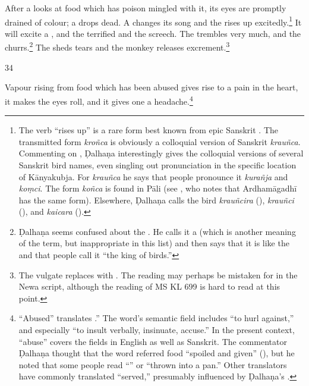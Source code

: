 \begin{translation}

After a  looks at
food which has poison mingled with it, its eyes are promptly drained of colour; a
 drops dead.  A  changes its song and the 
rises up excitedly.\footnote{The verb  “rises up” is a rare form
best known from epic Sanskrit \citep[see][212, \S 7.6.1]{ober-2003}.   The
transmitted form \emph{kroñca} is obviously a colloquial version of Sanskrit
\emph{krauñca}.  Commenting on , Ḍalhaṇa interestingly gives 
the
colloquial versions of several Sanskrit bird names, even singling out 
pronunciation in the specific location of Kānyakubja.  For \emph{krauñca} he says
that people pronounce it \emph{kurañja} and \emph{koṃci}.  The form 
\emph{koñca} is found in Pāli (see \cite[731]{cone-dict}, who notes that 
Ardhamāgadhī has the same form). Elsewhere, Ḍalhaṇa calls the bird 
\emph{krauñcira} (),  \emph{krauñci} 
(), and \emph{kaicara} ().}  It will excite a
, and the terrified
 and the 
screech. The  trembles very much, and the
churrs.\footnote{Ḍalhaṇa seems confused about the .  He calls it 
a
 (which is another meaning of the term, but inappropriate 
in
this list) and then says that it is like the  and that people
call it “the king of birds.”} The   sheds tears and the monkey
releases excrement.\footnote{The vulgate replaces  with
.  The reading  may perhaps be mistaken for
 in the Newa script, although the reading of MS KL 699 is hard to read at this 
point.}

\item[34]

Vapour rising from food which has been abused gives rise to a pain in the
heart, it makes the eyes roll, and it gives one a headache.\footnote{ “Abused” translates 
.”  The word's semantic field includes “to hurl against,” and especially “to 
insult verbally, insinuate, accuse.”  In the present context, “abuse” covers the fields in English 
as well as Sanskrit.  The commentator Ḍalhaṇa thought that the word referred food “spoiled 
and given” (), but he noted that some people 
read “” or “thrown into a pan.”  Other translators have commonly 
translated “served,” presumably influenced by Ḍalhaṇa's .}

 
    \end{translation}